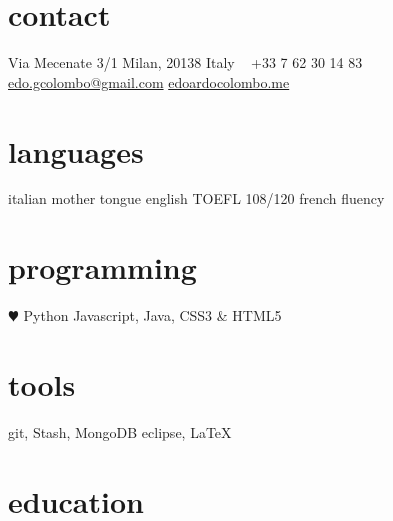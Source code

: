 \documentclass[]{friggeri-cv} %
\begin{document}


\begin{aside} %
\section{contact}
Via Mecenate 3/1
Milan, 20138
Italy
~
+33 7 62 30 14 83
~
\href{mailto:edo.gcolombo@gmail.com}{edo.gcolombo@gmail.com}
\href{http://edoardocolombo.me}{edoardocolombo.me}
\section{languages}
italian mother tongue
english TOEFL 108/120
french fluency
\section{programming}
{\color{red} $\varheartsuit$} Python
Javascript, Java,
CSS3 \& HTML5
\section{tools}
git, Stash, MongoDB
eclipse, \LaTeX
\end{aside}


\section{education}
\end{document}

